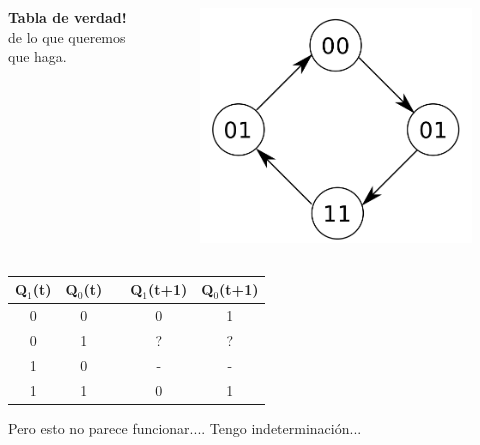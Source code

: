 \documentclass[10pt]{beamer}
\begin{document}
\begin{frame}
{\begin{columns}
            \textbf{Tabla de verdad!} de lo que queremos que haga.
              \begin{figure}[h!]
                  \centering
                  \includegraphics[scale=0.2]{ej1.png}
              \end{figure}
      \end{columns}
\begin{table}[h!]
      \begin{tabular}{|c|c|c|c|c|}
      \hline
      Q$_1$(t) & Q$_0$(t) &  & Q$_1$(t+1) & Q$_0$(t+1) \\ \hline
      0        & 0        &  & 0          & 1          \\ \hline
      0        & 1        &  & ?          & ?          \\ \hline
      1        & 0        &  & -          & -          \\ \hline
      1        & 1        &  & 0          & 1          \\ \hline
      \end{tabular}
      \end{table}Pero esto no parece funcionar.... Tengo indeterminación...}
\end{frame}
\end{document}
